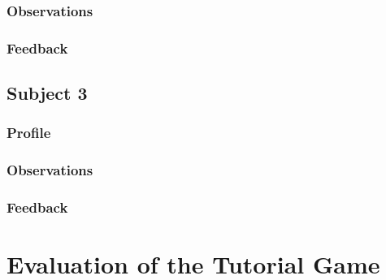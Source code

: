 \subsubsection{Observations}

\subsubsection{Feedback}


\subsection{Subject 3}
\label{game_testing_subject3}


\subsubsection{Profile}

\subsubsection{Observations}

\subsubsection{Feedback}


\section{Evaluation of the Tutorial Game}


